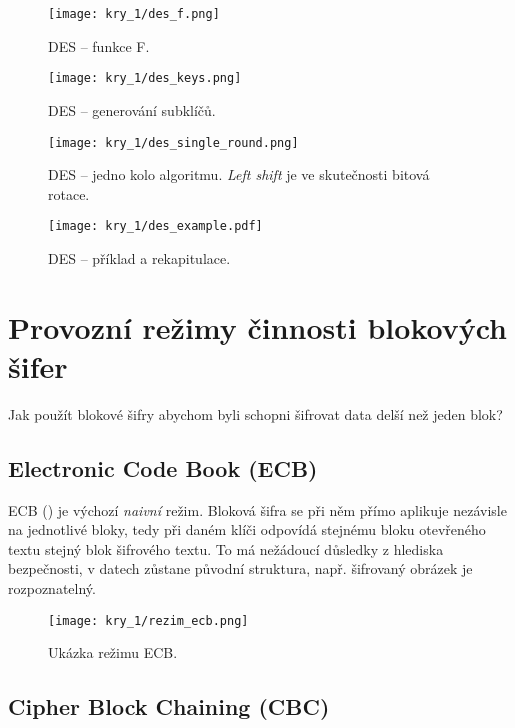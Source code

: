 \begin{figure}[H]
    \centering
    \texttt{[image: kry\_1/des\_f.png]}
    \caption{DES -- funkce F.}
\end{figure}

\begin{figure}[H]
    \centering
    \texttt{[image: kry\_1/des\_keys.png]}
    \caption{DES -- generování subklíčů.}
\end{figure}

\begin{figure}[H]
    \centering
    \texttt{[image: kry\_1/des\_single\_round.png]}
    \caption{DES -- jedno kolo algoritmu. \textit{Left shift} je ve skutečnosti bitová rotace.}
\end{figure}

\begin{figure}[H]
    \centering
    \texttt{[image: kry\_1/des\_example.pdf]}
    \caption{DES -- příklad a rekapitulace.}
\end{figure}


\section{Provozní režimy činnosti blokových šifer}

Jak použít blokové šifry abychom byli schopni šifrovat data delší než jeden blok?

\subsection*{Electronic Code Book (ECB)}

ECB () je výchozí \textit{naivní} režim. Bloková šifra se při něm přímo aplikuje nezávisle na jednotlivé bloky, tedy při daném klíči odpovídá stejnému bloku otevřeného textu stejný blok šifrového textu. To má nežádoucí důsledky z hlediska bezpečnosti, v datech zůstane původní struktura, např. šifrovaný obrázek je rozpoznatelný.

\begin{figure}[H]
    \centering
    \texttt{[image: kry\_1/rezim\_ecb.png]}
    \caption{Ukázka režimu ECB.}
\end{figure}

\subsection*{Cipher Block Chaining (CBC)}

